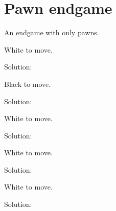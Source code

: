 \documentclass{book}
\begin{document}
\section{Pawn endgame}
An endgame with only pawns.\begin{multicols}{2} 
\begin{samepage} 
\newgame 


 
\showboard
 
 White to move. 
 
Solution: 
 
\end{samepage}\begin{samepage} 
\newgame 


 
\showboard
 
 Black to move. 
 
Solution: 
 
\end{samepage}\begin{samepage} 
\newgame 


 
\showboard
 
 White to move. 
 
Solution: 
 
\end{samepage}\begin{samepage} 
\newgame 


 
\showboard
 
 White to move. 
 
Solution: 
 
\end{samepage}\begin{samepage} 
\newgame 


 
\showboard
 
 White to move. 
 
Solution: 
 
\end{samepage}\begin{samepage} 
\newgame 


\end{samepage}
\end{multicols}
\end{document}
